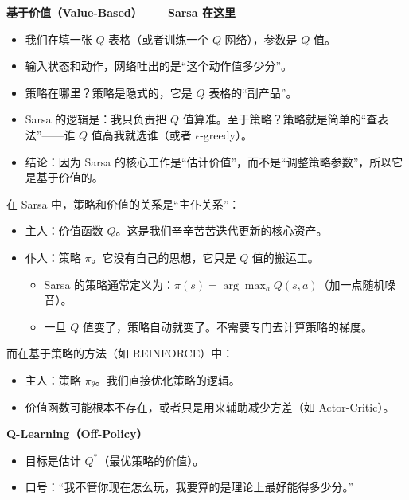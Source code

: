 \textbf{基于价值（Value-Based）------Sarsa 在这里}

\begin{itemize}
\tightlist
\item
  我们在填一张 \(Q\) 表格（或者训练一个 \(Q\) 网络），参数是 \(Q\) 值。
\item
  输入状态和动作，网络吐出的是``这个动作值多少分''。
\item
  策略在哪里？策略是隐式的，它是 \(Q\) 表格的``副产品''。
\item
  Sarsa 的逻辑是：我只负责把 \(Q\) 值算准。至于策略？策略就是简单的``查表法''------谁 \(Q\) 值高我就选谁（或者 \(\epsilon\)-greedy）。
\item
  结论：因为 Sarsa 的核心工作是``估计价值''，而不是``调整策略参数''，所以它是基于价值的。
\end{itemize}

在 Sarsa 中，策略和价值的关系是``主仆关系''：

\begin{itemize}
\tightlist
\item
  主人：价值函数 \(Q\)。这是我们辛辛苦苦迭代更新的核心资产。
\item
  仆人：策略 \(\pi\)。它没有自己的思想，它只是 \(Q\) 值的搬运工。

  \begin{itemize}
  \tightlist
  \item
    Sarsa 的策略通常定义为：\(\pi(s)=\arg\max_a Q(s,a)\)（加一点随机噪音）。
  \item
    一旦 \(Q\) 值变了，策略自动就变了。不需要专门去计算策略的梯度。
  \end{itemize}
\end{itemize}

而在基于策略的方法（如 REINFORCE）中：

\begin{itemize}
\tightlist
\item
  主人：策略 \(\pi_\theta\)。我们直接优化策略的逻辑。
\item
  价值函数可能根本不存在，或者只是用来辅助减少方差（如 Actor-Critic）。
\end{itemize}

\textbf{Q-Learning（Off-Policy）}

\begin{itemize}
\tightlist
\item
  目标是估计 \(Q^*\)（最优策略的价值）。
\item
  口号：``我不管你现在怎么玩，我要算的是理论上最好能得多少分。''
\end{itemize}

